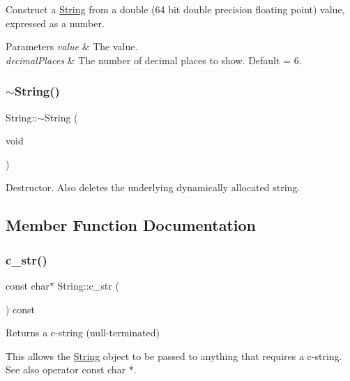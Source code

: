 Construct a \hyperlink{class_string}{String} from a double (64 bit double precision floating point) value, expressed as a number. 


\begin{DoxyParams}{Parameters}
{\em value} & The value.\\
\hline
{\em decimal\+Places} & The number of decimal places to show. Default = 6. \\
\hline
\end{DoxyParams}
\mbox{\label{class_string_ab4027f1abc8f8c0134f6098126de71e5}} 
\subsubsection{\texorpdfstring{$\sim$\+String()}{~String()}}
{\footnotesize\ttfamily String\+::$\sim$\+String (\begin{DoxyParamCaption}\item[{void}]{ }\end{DoxyParamCaption})}



Destructor. Also deletes the underlying dynamically allocated string. 



\subsection{Member Function Documentation}
\mbox{\label{class_string_a0274f3e61533d15086816fb7f47ccb54}} 
\subsubsection{\texorpdfstring{c\+\_\+str()}{c\_str()}}
{\footnotesize\ttfamily const char$\ast$ String\+::c\+\_\+str (\begin{DoxyParamCaption}{ }\end{DoxyParamCaption}) const\hspace{0.3cm}{\ttfamily [inline]}}



Returns a c-\/string (null-\/terminated) 

This allows the \hyperlink{class_string}{String} object to be passed to anything that requires a c-\/string. See also operator const char $\ast$.

